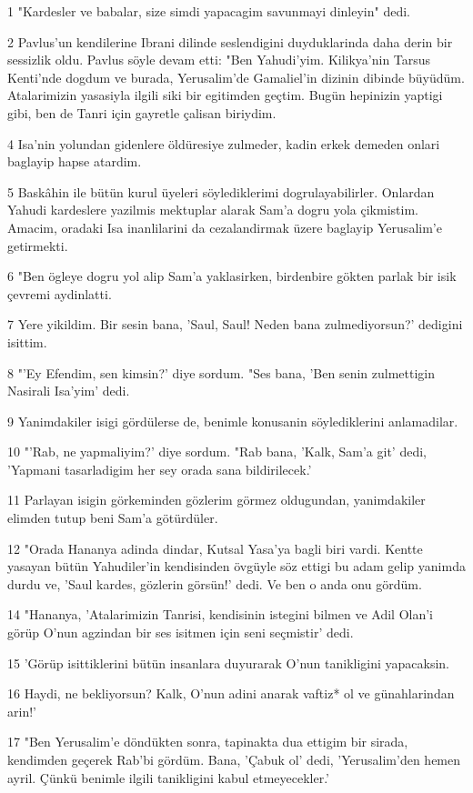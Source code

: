 \par 1 "Kardesler ve babalar, size simdi yapacagim savunmayi dinleyin" dedi.
\par 2 Pavlus'un kendilerine Ibrani dilinde seslendigini duyduklarinda daha derin bir sessizlik oldu. Pavlus söyle devam etti: "Ben Yahudi'yim. Kilikya'nin Tarsus Kenti'nde dogdum ve burada, Yerusalim'de Gamaliel'in dizinin dibinde büyüdüm. Atalarimizin yasasiyla ilgili siki bir egitimden geçtim. Bugün hepinizin yaptigi gibi, ben de Tanri için gayretle çalisan biriydim.
\par 4 Isa'nin yolundan gidenlere öldüresiye zulmeder, kadin erkek demeden onlari baglayip hapse atardim.
\par 5 Baskâhin ile bütün kurul üyeleri söylediklerimi dogrulayabilirler. Onlardan Yahudi kardeslere yazilmis mektuplar alarak Sam'a dogru yola çikmistim. Amacim, oradaki Isa inanlilarini da cezalandirmak üzere baglayip Yerusalim'e getirmekti.
\par 6 "Ben ögleye dogru yol alip Sam'a yaklasirken, birdenbire gökten parlak bir isik çevremi aydinlatti.
\par 7 Yere yikildim. Bir sesin bana, 'Saul, Saul! Neden bana zulmediyorsun?' dedigini isittim.
\par 8 "'Ey Efendim, sen kimsin?' diye sordum. "Ses bana, 'Ben senin zulmettigin Nasirali Isa'yim' dedi.
\par 9 Yanimdakiler isigi gördülerse de, benimle konusanin söylediklerini anlamadilar.
\par 10 "'Rab, ne yapmaliyim?' diye sordum. "Rab bana, 'Kalk, Sam'a git' dedi, 'Yapmani tasarladigim her sey orada sana bildirilecek.'
\par 11 Parlayan isigin görkeminden gözlerim görmez oldugundan, yanimdakiler elimden tutup beni Sam'a götürdüler.
\par 12 "Orada Hananya adinda dindar, Kutsal Yasa'ya bagli biri vardi. Kentte yasayan bütün Yahudiler'in kendisinden övgüyle söz ettigi bu adam gelip yanimda durdu ve, 'Saul kardes, gözlerin görsün!' dedi. Ve ben o anda onu gördüm.
\par 14 "Hananya, 'Atalarimizin Tanrisi, kendisinin istegini bilmen ve Adil Olan'i görüp O'nun agzindan bir ses isitmen için seni seçmistir' dedi.
\par 15 'Görüp isittiklerini bütün insanlara duyurarak O'nun tanikligini yapacaksin.
\par 16 Haydi, ne bekliyorsun? Kalk, O'nun adini anarak vaftiz* ol ve günahlarindan arin!'
\par 17 "Ben Yerusalim'e döndükten sonra, tapinakta dua ettigim bir sirada, kendimden geçerek Rab'bi gördüm. Bana, 'Çabuk ol' dedi, 'Yerusalim'den hemen ayril. Çünkü benimle ilgili tanikligini kabul etmeyecekler.'
